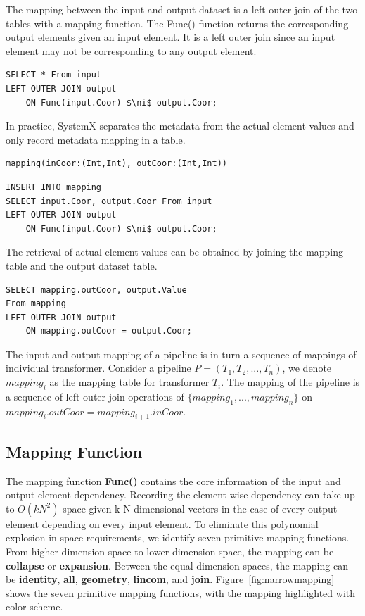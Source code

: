 \documentclass{sig-alternate}
\begin{document}
The mapping between the input and output dataset is a left outer join of the two tables with a mapping function.
The Func() function returns the corresponding output elements given an input element. 
It is a left outer join since an input element may not be corresponding to any output element.
\begin{lstlisting}
SELECT * From input
LEFT OUTER JOIN output 
    ON Func(input.Coor) $\ni$ output.Coor;
\end{lstlisting}

In practice, SystemX separates the metadata from the actual element values and only record metadata mapping
in a table.
\begin{lstlisting}
mapping(inCoor:(Int,Int), outCoor:(Int,Int))
\end{lstlisting}

\begin{lstlisting}
INSERT INTO mapping
SELECT input.Coor, output.Coor From input
LEFT OUTER JOIN output 
    ON Func(input.Coor) $\ni$ output.Coor;
\end{lstlisting}

The retrieval of actual element values can be obtained by joining the mapping table and the output dataset table.
\begin{lstlisting}
SELECT mapping.outCoor, output.Value
From mapping
LEFT OUTER JOIN output 
    ON mapping.outCoor = output.Coor;
\end{lstlisting}

The input and output mapping of a pipeline is in turn a sequence of mappings of individual transformer.
Consider a pipeline $P=(T_1, T_2, ..., T_n)$, we denote $mapping_i$ as the mapping table for transformer $T_i$.
The mapping of the pipeline is a sequence of left outer join operations of $\{mapping_1, ..., mapping_n\}$ 
on $mapping_i.outCoor = mapping_{i+1}.inCoor$.

\subsection{Mapping Function}
\label{sec:Map-Func}
The mapping function {\bf Func()} contains the core information of the input and output element dependency.
Recording the element-wise dependency can take up to $O(kN^2)$ space given k N-dimensional vectors in the case
of every output element depending on every input element. 
To eliminate this polynomial explosion in space requirements, we identify seven primitive mapping functions.
From higher dimension space to lower dimension space, the mapping can be {\bf collapse} or {\bf expansion}.
Between the equal dimension spaces, the mapping can be {\bf identity}, {\bf all}, {\bf geometry}, {\bf lincom}, and {\bf join}.
Figure~\ref{fig:narrowmapping} shows the seven primitive mapping functions, with the mapping highlighted with color scheme.
\end{document}
